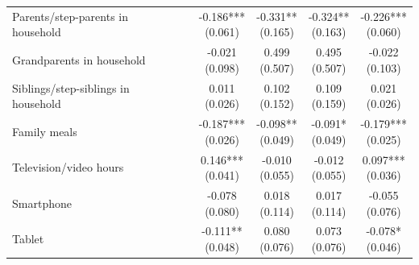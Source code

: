 \begin{table}[!htbp]
\begin{tabular}{p{}cccccc}
\\
Parents/step-parents in household &  &  & \shortstack[c]{-0.186*** \\[-0.35ex] (0.061)} & \shortstack[c]{-0.331** \\[-0.35ex] (0.165)} & \shortstack[c]{-0.324** \\[-0.35ex] (0.163)} & \shortstack[c]{-0.226*** \\[-0.35ex] (0.060)}
\\
Grandparents in household &  &  & \shortstack[c]{-0.021 \\[-0.35ex] (0.098)} & \shortstack[c]{0.499 \\[-0.35ex] (0.507)} & \shortstack[c]{0.495 \\[-0.35ex] (0.507)} & \shortstack[c]{-0.022 \\[-0.35ex] (0.103)}
\\
Siblings/step-siblings in household &  &  & \shortstack[c]{0.011 \\[-0.35ex] (0.026)} & \shortstack[c]{0.102 \\[-0.35ex] (0.152)} & \shortstack[c]{0.109 \\[-0.35ex] (0.159)} & \shortstack[c]{0.021 \\[-0.35ex] (0.026)}
\\
Family meals &  &  & \shortstack[c]{-0.187*** \\[-0.35ex] (0.026)} & \shortstack[c]{-0.098** \\[-0.35ex] (0.049)} & \shortstack[c]{-0.091* \\[-0.35ex] (0.049)} & \shortstack[c]{-0.179*** \\[-0.35ex] (0.025)}
\\
Television/video hours &  &  & \shortstack[c]{0.146*** \\[-0.35ex] (0.041)} & \shortstack[c]{-0.010 \\[-0.35ex] (0.055)} & \shortstack[c]{-0.012 \\[-0.35ex] (0.055)} & \shortstack[c]{0.097*** \\[-0.35ex] (0.036)}
\\
Smartphone &  &  & \shortstack[c]{-0.078 \\[-0.35ex] (0.080)} & \shortstack[c]{0.018 \\[-0.35ex] (0.114)} & \shortstack[c]{0.017 \\[-0.35ex] (0.114)} & \shortstack[c]{-0.055 \\[-0.35ex] (0.076)}
\\
Tablet &  &  & \shortstack[c]{-0.111** \\[-0.35ex] (0.048)} & \shortstack[c]{0.080 \\[-0.35ex] (0.076)} & \shortstack[c]{0.073 \\[-0.35ex] (0.076)} & \shortstack[c]{-0.078* \\[-0.35ex] (0.046)}

\end{tabular}
\end{table}
